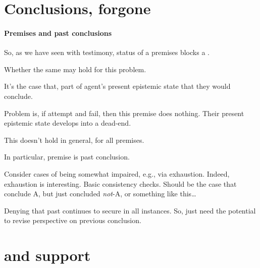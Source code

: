\section{Conclusions, forgone}
\label{sec:fc3-1}

\paragraph{Premises and past conclusions}

\begin{note}[Premises]
  So, as we have seen with testimony, status of a premises blocks a \requ{}.

  Whether the same may hold for this problem.

  It's the case that, part of agent's present epistemic state that they would conclude.

  Problem is, if attempt and fail, then this premise does nothing.
  Their present epistemic state develops into a dead-end.
\end{note}

\begin{note}[Note!]
  This doesn't hold in general, for all premises.

  In particular, premise is past conclusion.

  Consider cases of being somewhat impaired, e.g., via exhaustion.
  Indeed, exhaustion is interesting.
  Basic consistency checks.
  Should be the case that conclude A, but just concluded \emph{not}-A, or something like this\dots

  Denying that past continues to secure in all instances.
  So, just need the potential to revise perspective on previous conclusion.
\end{note}

\section{}
\label{cha:fcs:sec:fc}


\section{ and support}
\label{cha:fcs:sec:fc3-support}

